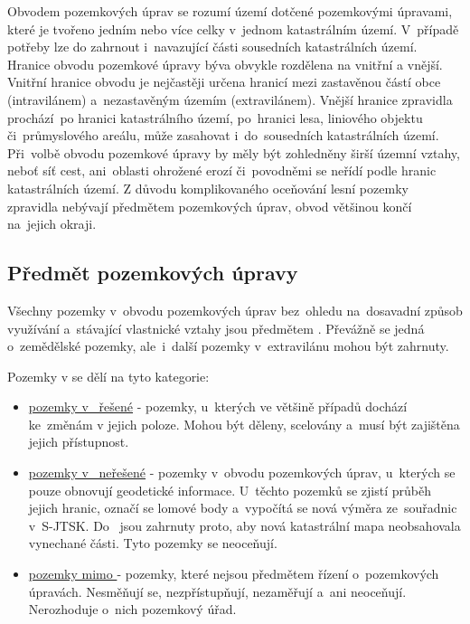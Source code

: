 Obvodem pozemkových úprav se rozumí území dotčené pozemkovými úpravami, které je tvořeno jedním nebo více celky v~jednom katastrálním území. V~případě potřeby lze do  zahrnout i~navazující části sousedních katastrálních území. Hranice obvodu pozemkové úpravy býva obvykle rozdělena na vnitřní a vnější. Vnitřní hranice obvodu je nejčastěji určena hranicí mezi zastavěnou částí obce (intravilánem) a~nezastavěným územím (extravilánem). Vnější hranice zpravidla prochází~po hranici katastrálního území, po~hranici lesa, liniového objektu či~průmy\-slového areálu, může zasahovat i~do~sousedních katastrálních území. Při~volbě obvodu pozemkové úpravy by měly být zohledněny širší územní vztahy, neboť síť cest, ani~oblasti ohrožené erozí či~povodněmi se neřídí podle hranic katastrálních území. Z důvodu komplikovaného oceňování lesní pozemky zpravidla nebývají předmětem pozemkových úprav, obvod většinou končí na~jejich okraji.

\subsection{Předmět pozemkových úpravy}
\label{predmet_pu}

Všechny pozemky v~obvodu pozemkových úprav bez~ohledu na~dosavadní způsob využívání a~stávající vlastnické vztahy jsou předmětem . Převážně se jedná o~zemědělské pozemky, ale~i~další pozemky v~extravilánu mohou být zahrnuty.

Pozemky v  se dělí na tyto kategorie:
	\begin{itemize}[leftmargin=1.5cm, noitemsep]
		\item \underline{pozemky v~ řešené} - pozemky, u~kte\-rých ve většině případů dochází ke~změnám v jejich poloze. Mohou být děleny, scelovány a~musí být zajištěna jejich přístupnost.
		\item \underline{pozemky v~ neřešené} - pozemky v~obvodu pozemkových úprav, u~kterých se pouze obnovují geodetické informace. U~těchto pozemků se zjistí průběh jejich hranic, označí se lomové body a~vypočítá se nová výměra ze~souřadnic v~S-JTSK. Do~ jsou zahrnuty proto, aby nová katastrální mapa neobsahovala vynechané části. Tyto pozemky se neoceňují.
		\item \underline{pozemky mimo } - pozemky, které nejsou předmětem řízení o~pozemko\-vých úpravách. Nesměňují se, nezpřístupňují, nezaměřují a~ani neoceňují. Nerozhoduje o~nich pozemkový úřad.
	\end{itemize}

